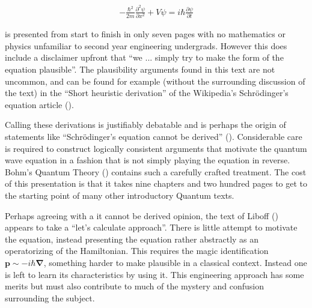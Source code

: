 \documentclass[]{eliblog}
\newcommand{\Bp}[0]{\mathbf{p}}
\newcommand{\spacegrad}[0]{\boldsymbol{\nabla}}
\begin{document}
\begin{align}\label{eqn:oneDimSch}
-\frac{\hbar^2}{2m} \frac{\partial^2 \psi}{\partial x^2} + V\psi = i \hbar \frac{\partial \psi}{\partial t}
\end{align}

is presented from start to finish in only seven pages with no mathematics or physics unfamiliar to second year engineering undergrads.  However this does include a disclaimer upfront that ``we ... simply try to make the form of the equation plausible''.  The plausibility arguments found in this text are not uncommon, and can be found for example (without the surrounding discussion of the text) in the ``Short heuristic derivation'' of the Wikipedia's Schr\"{o}dinger's equation article (\cite{wikiSchH}).

Calling these derivations is justifiably debatable and is perhaps the origin of statements like ``Schr\"{o}dinger's equation cannot be derived'' (\cite{hyperphysicsSch}).
Considerable care is required to construct logically consistent arguments that motivate the quantum wave equation in a fashion that is not simply playing the equation in reverse.  Bohm's Quantum Theory (\cite{bohm1989qt}) contains such a carefully crafted treatment.  The cost of this presentation is that it takes nine chapters and two hundred pages to get to the starting point of many other introductory Quantum texts.

Perhaps agreeing with a it cannot be derived opinion, the text of Liboff (\cite{liboff2003iqm}) appears to take a ``let's calculate approach''.  There is little attempt to motivate the equation, instead presenting the equation rather abstractly as an operatorizing of the Hamiltonian.  This requires the magic identification $\Bp \sim -i \hbar \spacegrad$, something harder to make plausible in a classical context.
Instead one is left to learn its characteristics by using it.  This engineering approach has some merits but must also contribute to much of the mystery and confusion surrounding the subject.



\end{document}
